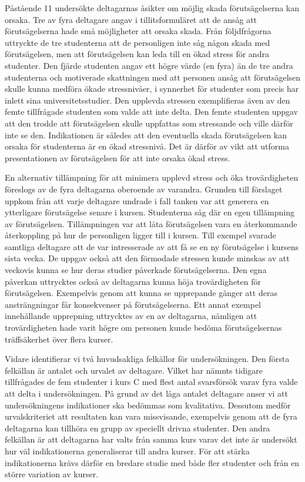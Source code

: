 Påstående 11 undersökte deltagarnas åsikter om möjlig skada förutsägelserna kan orsaka. Tre av fyra deltagare angav i tillitsformuläret att de ansåg att förutsägelserna hade små möjligheter att orsaka skada. Från följdfrågorna uttryckte de tre studenterna att de personligen inte såg någon skada med förutsägelsen, men att förutsägelsen kan leda till en ökad stress för andra studenter. Den fjärde studenten angav ett högre värde (en fyra) än de tre andra studenterna och motiverade skattningen med att personen ansåg att förutsägelsen skulle kunna medföra ökade stressnivåer, i synnerhet för studenter som precis har inlett sina universitetsstudier. Den upplevda stressen exemplifieras även av den femte tillfrågade studenten som valde att inte delta. Den femte studenten uppgav att den trodde att förutsägelsen skulle uppfattas som stressande och ville därför inte se den. Indikationen är således att den eventuella skada förutsägelsen kan orsaka för studenterna är en ökad stressnivå. Det är därför av vikt att utforma presentationen av förutsägelsen för att inte orsaka ökad stress.

En alternativ tillämpning för att minimera upplevd stress och öka trovärdigheten föreslogs av de fyra deltagarna oberoende av varandra. Grunden till förslaget uppkom från att varje deltagare undrade i fall tanken var att generera en ytterligare förutsägelse senare i kursen. Studenterna såg där en egen tillämpning av förutsägelsen. Tillämpningen var att låta förutsägelsen vara en återkommande återkoppling på hur de personligen ligger till i kursen. Till exempel svarade samtliga deltagare att de var intresserade av att få se en ny förutsägelse i kursens sista vecka. De uppgav också att den förmodade stressen kunde minskas av att veckovis kunna se hur deras studier påverkade förutsägelserna. Den egna påverkan uttrycktes också av deltagarna kunna höja trovärdigheten för förutsägelsen. Exempelvis genom att kunna se upprepande gånger att deras ansträngningar får konsekvenser på förutsägelserna. Ett annat exempel innehållande upprepning uttrycktes av en av deltagarna, nämligen att trovärdigheten hade varit högre om personen kunde bedöma förutsägelsernas träffsäkerhet över flera kurser.

Vidare identifierar vi två huvudsakliga felkällor för undersökningen. Den första felkällan är antalet och urvalet av deltagare. Vilket har nämnts tidigare tillfrågades de fem studenter i kurs C med flest antal svarsförsök varav fyra valde att delta i undersökningen. På grund av det låga antalet deltagare anser vi att undersökningens indikationer ska bedömmas som kvalitativa. Dessutom medför urvalskriteriet att resultaten kan vara missvisande, exempelvis genom att de fyra deltagarna kan tillhöra en grupp av speciellt drivna studenter. Den andra felkällan är att deltagarna har valts från samma kurs varav det inte är undersökt hur väl indikationerna generaliserar till andra kurser. För att stärka indikationerna krävs därför en bredare studie med både fler studenter och från en större variation av kurser.

